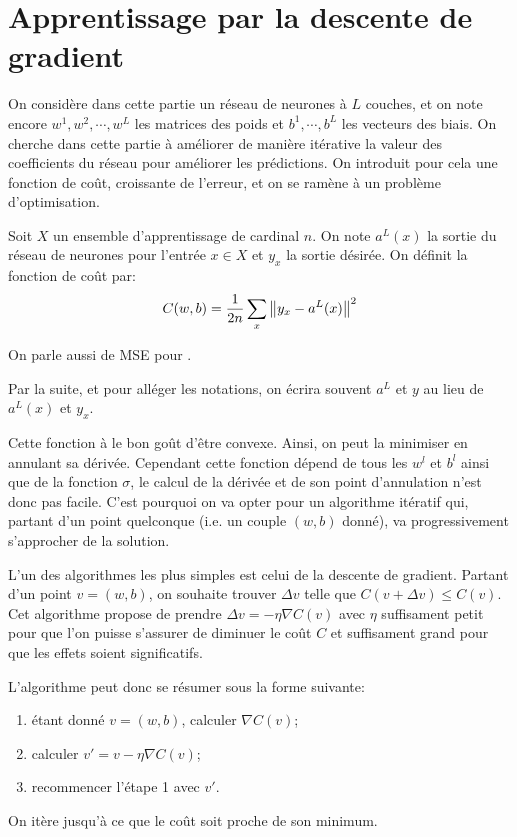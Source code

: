 \section{Apprentissage par la descente de gradient}


On considère dans cette partie un réseau de neurones à $L$ couches, et on note 
encore $w^{1}, w^{2}, \cdots, w^{L}$ les matrices des poids et $b^{1}, \cdots, b^{L}$
les vecteurs des biais. 
On cherche dans cette partie à améliorer de manière itérative la valeur des 
coefficients du réseau pour améliorer les prédictions. 
On introduit pour cela une fonction de coût, croissante de l'erreur, et 
on se ramène à un problème d'optimisation.

\begin{definition}
Soit $X$ un ensemble d'apprentissage de cardinal $n$. 
On note $a^{L}(x)$ la sortie du réseau de neurones pour l'entrée $x \in X$ et 
$y_{x}$ la sortie désirée. On définit la fonction de coût par:
\[
C(w, b) = \frac{1}{2n} \sum_{x} \left\Vert y_{x} - a^{L}(x)\right\Vert^2
\]
\end{definition}

On parle aussi de \textsc{MSE} pour .

Par la suite, et pour alléger les notations, on écrira souvent $a^{L}$ et $y$ 
au lieu de $a^{L}(x)$ et $y_x$.

Cette fonction à le bon goût d'être convexe. Ainsi, on peut la minimiser en annulant 
sa dérivée. 
Cependant cette fonction dépend de tous les $w^{l}$ et $b^{l}$ ainsi que de la fonction 
$\sigma$, le calcul de la dérivée et de son point d'annulation n'est donc pas facile.
C'est pourquoi on va opter pour un algorithme itératif qui, partant d'un point quelconque 
(i.e.\/ un couple $(w,b)$ donné), va progressivement s'approcher de la solution. 

L'un des algorithmes les plus simples est celui de la descente de gradient.
Partant d'un point $v = (w,b)$, on souhaite trouver $\Delta v$ telle que 
$C(v + \Delta v) \leq C(v)$. Cet algorithme propose de prendre 
$\Delta v = -\eta\nabla C(v)$ avec $\eta$ suffisament petit pour que 
l'on puisse s'assurer de diminuer le coût $C$ et suffisament grand pour que les 
effets soient significatifs.

L'algorithme peut donc se résumer sous la forme suivante:
\begin{enumerate}
  \item étant donné $v = (w, b)$, calculer $\nabla C(v)$;
  \item calculer $v' = v - \eta \nabla C(v)$;
  \item recommencer l'étape 1 avec $v'$.
\end{enumerate}
On itère jusqu'à ce que le coût soit proche de son minimum.

